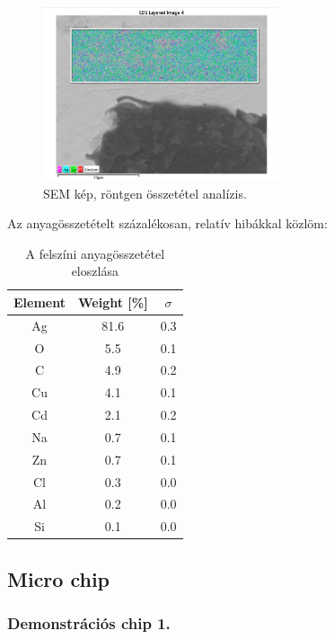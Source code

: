 \documentclass[a4paper,12pt]{article}
\begin{document}
\begin{figure}[H]
	\centering
	\includegraphics[width=0.62\textwidth]{./Jcsop/lancrtg.png}
	\caption{SEM kép, röntgen összetétel analízis.}
\end{figure}

\par Az anyagösszetételt százalékosan, relatív hibákkal közlöm:

\begin{table}[H]
	\centering
	\begin{tabular}{|c|c|c|}  \hline
		Element & Weight [\%] & $\sigma$ \\ \hline
		Ag      & 81.6        & 0.3      \\ \hline
		O       & 5.5         & 0.1      \\ \hline
		C       & 4.9         & 0.2      \\ \hline
		Cu      & 4.1         & 0.1      \\ \hline
		Cd      & 2.1         & 0.2      \\ \hline
		Na      & 0.7         & 0.1      \\ \hline
		Zn      & 0.7         & 0.1      \\ \hline
		Cl      & 0.3         & 0.0      \\ \hline
		Al      & 0.2         & 0.0      \\ \hline
		Si      & 0.1         & 0.0      \\ \hline
	\end{tabular}
	\caption{A felszíni anyagösszetétel eloszlása}
	\label{my-label}
\end{table}

\subsection{ Micro chip}

\subsubsection{ Demonstrációs chip 1.}
\end{document}
